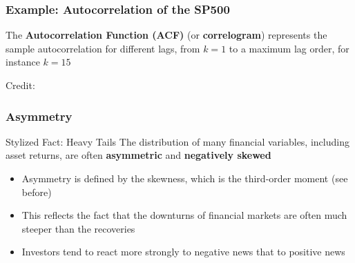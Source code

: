 \documentclass{beamer}
\begin{document}
\begin{frame}
  \frametitle{Example: Autocorrelation of the SP500}
  The \textbf{Autocorrelation Function (ACF)} (or \textbf{correlogram}) represents the sample autocorrelation for different lags, from $k=1$ to a maximum lag order, for instance $k=15$

 \hspace*{15pt}\hbox{\scriptsize Credit:} 
\end{frame}



\begin{frame}
  \frametitle{Asymmetry}

  \begin{block}{Stylized Fact: Heavy Tails}
    The distribution of many financial variables, including asset returns, are often \textbf{asymmetric} and \textbf{negatively skewed}
  \end{block}

  \begin{itemize}
  \item Asymmetry is defined by the skewness, which is the third-order moment (see before)
  \item This reflects the fact that the downturns of financial markets are often much steeper than the recoveries
  \item Investors tend to react more strongly to negative news that to positive news 
  \end{itemize}
\end{frame}
\end{document}
